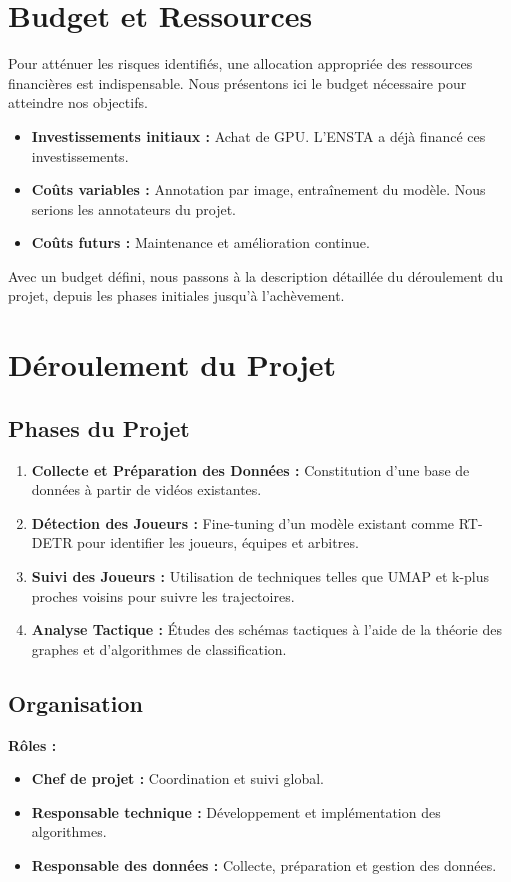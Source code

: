 \section{Budget et Ressources}
Pour atténuer les risques identifiés, une allocation appropriée des ressources financières est indispensable. Nous présentons ici le budget nécessaire pour atteindre nos objectifs.
\begin{itemize}
    \item \textbf{Investissements initiaux :} Achat de GPU. L'ENSTA a déjà financé ces investissements. 
    \item \textbf{Coûts variables :} Annotation par image, entraînement du modèle. Nous serions les annotateurs du projet.
    \item \textbf{Coûts futurs :} Maintenance et amélioration continue.
\end{itemize}
Avec un budget défini, nous passons à la description détaillée du déroulement du projet, depuis les phases initiales jusqu'à l'achèvement.
\section{Déroulement du Projet}
\subsection{Phases du Projet}
\begin{enumerate}
    \item \textbf{Collecte et Préparation des Données :} Constitution d’une base de données à partir de vidéos existantes.
    \item \textbf{Détection des Joueurs :} Fine-tuning d’un modèle existant comme RT-DETR pour identifier les joueurs, équipes et arbitres.
    \item \textbf{Suivi des Joueurs :} Utilisation de techniques telles que UMAP et k-plus proches voisins pour suivre les trajectoires.
    \item \textbf{Analyse Tactique :} Études des schémas tactiques à l’aide de la théorie des graphes et d’algorithmes de classification.
\end{enumerate}

\subsection{Organisation}
\textbf{Rôles :}
\begin{itemize}
    \item \textbf{Chef de projet :} Coordination et suivi global.
    \item \textbf{Responsable technique :} Développement et implémentation des algorithmes.
    \item \textbf{Responsable des données :} Collecte, préparation et gestion des données.
\end{itemize}


